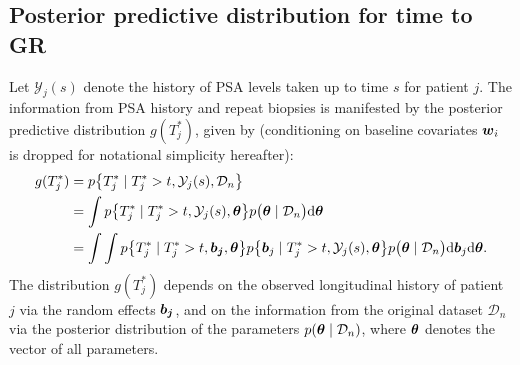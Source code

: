
\subsection{Posterior predictive distribution for time to GR}
\label{subsec : ppd_time_to_GR}
Let $\mathcal{Y}_j(s)$ denote the history of PSA levels taken up to time $s$ for patient $j$. The information from PSA history and repeat biopsies is manifested by the posterior predictive distribution $g(T^*_j)$, given by (conditioning on baseline covariates $\boldsymbol{w}_i$ is dropped for notational simplicity hereafter):
\begin{equation}
\label{eq : dyn_dist_fail_time}
\begin{split}
g(T^*_j) &= p\big\{T^*_j \mid T^*_j > t, \mathcal{Y}_j(s), \mathcal{D}_n\big\}\\
&= \int p\big\{T^*_j \mid T^*_j > t, \mathcal{Y}_j(s), \bmath{\theta}\big\} p\big(\bmath{\theta} \mid \mathcal{D}_n\big) \rmn{d} \bmath{\theta}\\
&= \int \int p\big\{T^*_j \mid T^*_j > t, \bmath{b_j}, \bmath{\theta}\big\} p\big\{\bmath{b}_j \mid T^*_j>t, \mathcal{Y}_j(s), \bmath{\theta}\big\}p\big(\bmath{\theta} \mid \mathcal{D}_n\big) \rmn{d} \bmath{b}_j \rmn{d} \bmath{\theta}.
\end{split}
\end{equation}
The distribution $g(T^*_j)$ depends on the observed longitudinal history of patient $j$ via the random effects $\boldsymbol{b_j}$, and on the information from the original dataset $\mathcal{D}_n$ via the posterior distribution of the parameters $p(\boldsymbol{\theta} \mid \mathcal{D}_n)$, where $\boldsymbol{\theta}$ denotes the vector of all parameters.